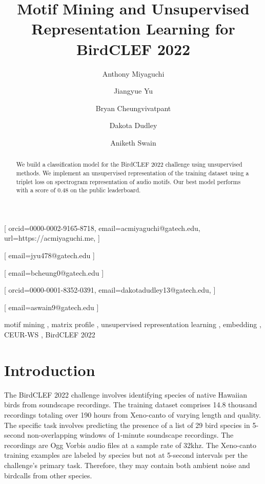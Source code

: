 \documentclass[
]{ceurart}
\begin{document}


\title{Motif Mining and Unsupervised Representation Learning for BirdCLEF 2022}

\author[1]{Anthony Miyaguchi}[
orcid=0000-0002-9165-8718,
email=acmiyaguchi@gatech.edu,
url=https://acmiyaguchi.me,
]
\author[1]{Jiangyue Yu}[
email=jyu478@gatech.edu
]
\author[1]{Bryan Cheungvivatpant}[
email=bcheung0@gatech.edu
]
\author[1]{Dakota Dudley}[
orcid=0000-0001-8352-0391,
email=dakotadudley13@gatech.edu,
]
\author[1]{Aniketh Swain}[
email=aswain9@gatech.edu
]

\address[1]{Georgia Institute of Technology, North Ave NW, Atlanta, GA 30332}

\begin{abstract}
    We build a classification model for the BirdCLEF 2022 challenge using unsupervised methods. We implement an unsupervised representation of the training dataset using a triplet loss on spectrogram representation of audio motifs. Our best model performs with a score of 0.48 on the public leaderboard.
\end{abstract}

\begin{keywords}
  motif mining \sep
  matrix profile \sep
  unsupervised representation learning \sep
  embedding \sep
  CEUR-WS \sep
  BirdCLEF 2022
\end{keywords}

\maketitle

\section{Introduction}

The BirdCLEF 2022 challenge involves identifying species of native Hawaiian birds from soundscape recordings. The training dataset comprises 14.8 thousand recordings totaling over 190 hours from Xeno-canto \cite{xeno-canto} of varying length and quality. The specific task involves predicting the presence of a list of 29 bird species in 5-second non-overlapping windows of 1-minute soundscape recordings. The recordings are Ogg Vorbis audio files at a sample rate of 32khz. The Xeno-canto training examples are labeled by species but not at 5-second intervals per the challenge's primary task. Therefore, they may contain both ambient noise and birdcalls from other species.
\end{document}
